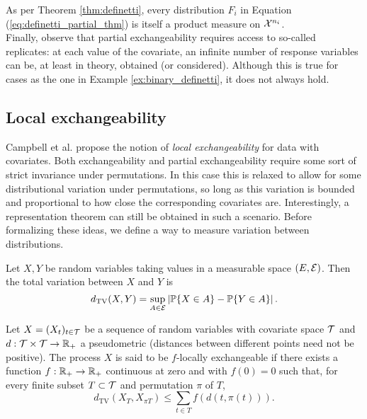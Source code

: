 As per Theorem \ref{thm:definetti}, every distribution $F_i$ in Equation (\ref{eq:definetti_partial_thm}) is itself a product measure on $\mathcal{X}^{n_i}$. \\


Finally, observe that partial exchangeability requires access to so-called replicates: at each value of the covariate, an infinite number of response variables can be, at least in theory, obtained (or considered). Although this is true for cases as the one in Example \ref{ex:binary_definetti}, it does not always hold.



\subsection{Local exchangeability}


Campbell et al. \cite{CampbellEtAl:2019:LocalExch} propose the notion of \textit{local exchangeability} for data with covariates. Both exchangeability and partial exchangeability require some sort of strict invariance under permutations. In this case this is relaxed to allow for some distributional variation under permutations, so long as this variation is bounded and proportional to how close the corresponding covariates are. Interestingly, a representation theorem can still be obtained in such a scenario. Before formalizing these ideas, we define a way to measure variation between distributions.


\begin{definition}
	Let $X, Y$ be random variables taking values in a measurable space $(E, \mathcal{E})$. Then the total variation between $X$ and $Y$ is
	\begin{equation*}
		d_{\mathrm{TV}} (X, Y) = \sup_{A \in \mathcal{E}} \left| \mathbb{P} \{ X \in A \} - \mathbb{P} \{Y \in A \} \right|.
	\end{equation*}
\end{definition}


\begin{definition} \label{def:local_exchangeability}
	Let $X = (X_t)_{t \in \mathcal{T}}$ be a sequence of random variables with covariate space $\mathcal{T}$ and $d: \mathcal{T} \times \mathcal{T} \to \mathbb{R}_{+}$ a pseudometric (distances between different points need not be positive). The process $X$ is said to be $f$-locally exchangeable if there exists a function $f: \mathbb{R}_{+} \to \mathbb{R}_{+}$ continuous at zero and with $f(0) = 0$ such that, for every finite subset $T \subset \mathcal{T}$ and permutation $\pi$ of $T$,
	\begin{equation} \label{eq:local_exch}
		d_{\mathrm{TV}} (X_T, X_{\pi T}) \leq \sum_{t \in T} f(d(t, \pi(t))).
	\end{equation}
\end{definition}


